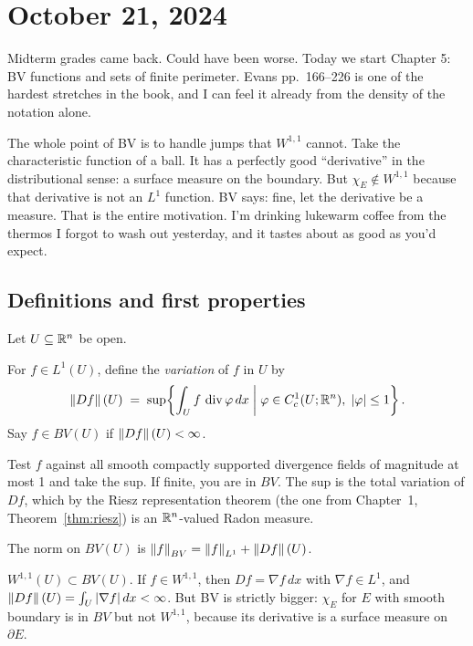 
\section{October 21, 2024}\label{sec:oct21}

Midterm grades came back. Could have been worse. Today we start Chapter 5: BV functions and sets of finite perimeter. Evans pp.\ 166--226 is one of the hardest stretches in the book, and I can feel it already from the density of the notation alone.

The whole point of BV is to handle jumps that $W^{1,1}$ cannot. Take the characteristic function of a ball. It has a perfectly good ``derivative'' in the distributional sense: a surface measure on the boundary. But $\chi_E \notin W^{1,1}$ because that derivative is not an $L^1$ function. BV says: fine, let the derivative be a measure. That is the entire motivation. I'm drinking lukewarm coffee from the thermos I forgot to wash out yesterday, and it tastes about as good as you'd expect.

\subsection{Definitions and first properties}\label{subsec:bv-defs}

Let $U \subseteq \mathbb{R}^n$ be open.

\begin{definition}[Variation]\label{def:bv-variation}
For $f \in L^1(U)$, define the \emph{variation} of $f$ in $U$ by
\[
  \left\|Df\right\|(U) \;=\; \sup\!\left\{ \int_U f \,\operatorname{div}\varphi \, dx \;\bigg|\; \varphi \in C_c^1(U; \mathbb{R}^n),\; |\varphi| \le 1 \right\}.
\]
Say $f \in BV(U)$ if $\left\|Df\right\|(U) < \infty$.
\end{definition}

Test $f$ against all smooth compactly supported divergence fields of magnitude at most 1 and take the sup. If finite, you are in $BV$. The sup is the total variation of $Df$, which by the Riesz representation theorem (the one from Chapter~1, Theorem~\ref{thm:riesz}) is an $\mathbb{R}^n$-valued Radon measure.

The norm on $BV(U)$ is $\left\|f\right\|_{BV} = \left\|f\right\|_{L^1} + \left\|Df\right\|(U)$.

\begin{remark}\label{rmk:sobolev-subset-bv}
$W^{1,1}(U) \subset BV(U)$. If $f \in W^{1,1}$, then $Df = \nabla f \, dx$ with $\nabla f \in L^1$, and $\left\|Df\right\|(U) = \int_U |\nabla f| \, dx < \infty$. But BV is strictly bigger: $\chi_E$ for $E$ with smooth boundary is in $BV$ but not $W^{1,1}$, because its derivative is a surface measure on $\partial E$.
\end{remark}

